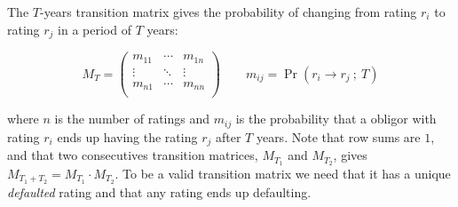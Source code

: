 \documentclass[11pt,fleqn]{book} %
\begin{document}
\begin{definition}
	\label{def:tm}
	The $T$-years transition matrix gives the probability of changing 
	from rating $r_i$ to rating $r_j$ in a period of $T$ years:
	{\small
	\begin{displaymath}
		M_T = \left(
		\begin{array}{ccc}
			m_{11} & \cdots & m_{1n} \\
			\vdots & \ddots & \vdots \\
			m_{n1} & \cdots & m_{nn} \\
		\end{array}
		\right)
		\qquad
		m_{ij} = \Pr(r_i \to r_j\ ;\ T)
	\end{displaymath}\par}
	where $n$ is the number of ratings and $m_{ij}$ is the probability that a
	obligor with rating $r_i$ ends up having the rating $r_j$ after $T$ years.
	Note that row sums are $1$, and that two consecutives transition matrices, 
	$M_{T_1}$ and $M_{T_2}$, gives $M_{T_1+T_2} = M_{T_1} \cdot M_{T_2}$.
	To be a valid transition matrix we need that it has a unique \emph{defaulted}
	rating and that any rating ends up defaulting.
\end{definition}
\end{document}
